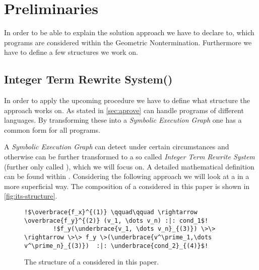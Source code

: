 \chapter{Preliminaries}
\label{chapter:preliminaries}

In order to be able to explain the solution approach we have to declare to, which programs are considered within the Geometric Nontermination. Furthermore we have to define a few structures we work on.

\section{Integer Term Rewrite System(\its)}
\label{sec:its}
In order to apply the upcoming procedure we have to define what structure the approach works on.
As stated in \autoref{sec:aprove} \aprove can handle programs of different languages. By transforming these into a \textit{Symbolic Execution Graph} one has a common form for all programs. %



A \textit{Symbolic Execution Graph} can detect \nonterm under certain circumstances and otherwise can be further transformed to a so called \textit{Integer Term Rewrite System} (further only called \its), which we will focus on. A detailed mathematical definition can be found within \cite{fuhs2009proving}. Considering the following approach we will look at a \its in a more superficial way. The composition of a \its considered in this paper is shown in \autoref{fig:its-structure}.\newline
\begin{figure}[H]
	\begin{lstlisting}[escapechar=!]
		!$\overbrace{f_x}^{(1)} \qquad\qquad \rightarrow \overbrace{f_y}^{(2)} (v_1, \dots v_n) :|: cond_1$!
		!$f_y(\underbrace{v_1, \dots v_n}_{(3)}) \>\> \rightarrow \>\> f_y \>(\underbrace{v^\prime_1,\dots v^\prime_n}_{(3)})  :|: \underbrace{cond_2}_{(4)}$!
	\end{lstlisting}
	\caption{The structure of a \its considered in this paper.}
	\label{fig:its-structure}
\end{figure}

